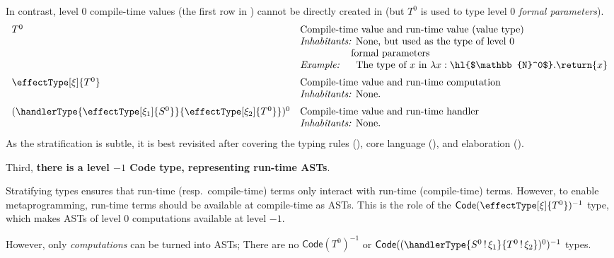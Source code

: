 In contrast, level $0$ compile-time values (the first row in ) cannot be directly created in \sourceLang{} (but $T^0$ is used to type level $0$ \textit{formal parameters}). 
\[\begin{array}{ll}
   T^0 & \text{Compile-time value and run-time value (value type)} \\
   & \textit{Inhabitants: } \text{None, but used as the type of level $0$}\\
    &\quad\quad\quad\quad\quad\, \text{formal parameters} \\
  & \textit{Example: } \;\;\,\,\,\,\text{The type of $x$ in $\lambda x: \hl{$\mathbb{N}^0$}. \return{x}$}\\[2mm]
   \effectType[\xi]{T^0} & \text{Compile-time value and run-time computation} \\
   & \textit{Inhabitants: } \text{None.}\\[2mm]
    (\handlerType{\effectType[\xi_1]{S^0}}{\effectType[\xi_2]{T^0}})^0 & \text{Compile-time value and run-time handler} \\
   & \textit{Inhabitants: } \text{None.}\\
\end{array}
\]
As the stratification is subtle, it is best revisited after covering the typing rules (), core language (), and elaboration ().

Third, \textbf{there is a level $-1$ \textsf{Code} type, representing run-time ASTs}.

  Stratifying types ensures that run-time (resp.\ compile-time) terms only interact with run-time (compile-time) terms. However, to enable metaprogramming, run-time terms should be available at compile-time as ASTs. This is the role of the $\textsf{Code}(\effectType[\xi]{T^0})^{-1}$ type, which makes ASTs of level $0$ computations available at level $-1$.

  However, only \textit{computations} can be turned into ASTs; There are no $\textsf{Code}({T^0})^{-1}$ or $\textsf{Code}((\handlerType{S^0 \, ! \, \xi_1}{T^0 \, ! \, \xi_2})^0)^{-1}$ types.

